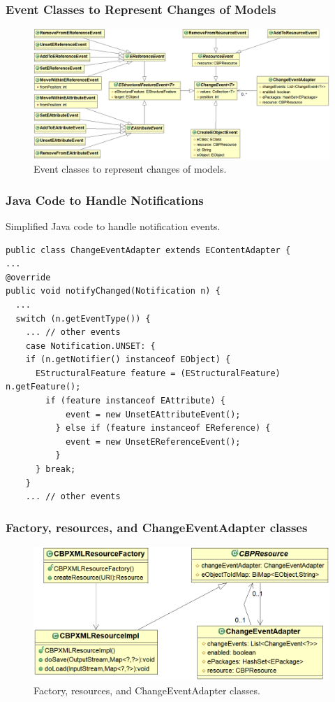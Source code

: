 \documentclass{beamer}
\begin{document}
\begin{frame}
\frametitle{Event Classes to Represent Changes of Models}
\begin{figure}[htbh]
\centering
\includegraphics[width=\linewidth]{events}
\caption{Event classes to represent changes of models.}
\label{fig:events}
\end{figure}
\end{frame}

\begin{frame}[fragile]
\frametitle{Java Code to Handle Notifications}
Simplified Java code to handle notification events.
\begin{lstlisting}[style=java,label=lst:javacode]
public class ChangeEventAdapter extends EContentAdapter {
...
@override
public void notifyChanged(Notification n) {
  ...
  switch (n.getEventType()) {
    ... // other events
    case Notification.UNSET: {
    if (n.getNotifier() instanceof EObject) {
      EStructuralFeature feature = (EStructuralFeature) n.getFeature();
        if (feature instanceof EAttribute) {
            event = new UnsetEAttributeEvent();
          } else if (feature instanceof EReference) {
            event = new UnsetEReferenceEvent();
          }
      } break;
    } 
    ... // other events
\end{lstlisting}

\end{frame}

\begin{frame}[fragile]
\frametitle{Factory, resources, and ChangeEventAdapter classes}
\begin{figure}[th]
\includegraphics[scale=0.4]{resources}
\caption{Factory, resources, and ChangeEventAdapter classes.}
\end{figure}
\end{frame}
\end{document}
